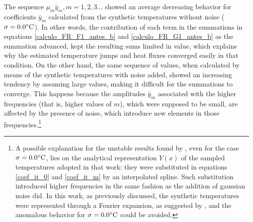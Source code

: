 \documentclass[12pt]{CHT-20}
\begin{document}
The sequence ${\mu_m\bar{y}_m, m = 1, 2, 3 \dots}$ showed an average decreasing behavior for coefficients $\bar{y}_m$ calculated from the synthetic temperatures without noise ($\sigma = 0.0\celsius$). In other words, the contribution of each term in the summations in equations \eqref{calculo_FR_F1_antes_b} and \eqref{calculo_FR_G1_antes_b} as the summation advanced, kept the resulting sums limited in value, which explains why the estimated temperature jumps and heat fluxes converged easily in that condition. On the other hand, the same sequence of values, when calculated by means of the synthetic temperatures with noise added, showed an increasing tendency by assuming large values, making it difficult for the summations to converge. This happens because the amplitudes $\bar{y}_m$ associated with the higher frequencies (that is, higher values of $m$), which were supposed to be small, are affected by the presence of noise, which introduce new elements in those frequencies.\footnote{A possible explanation for the unstable results found by \cite{artigo_padilha_3}, even for the case $\sigma = 0.0\celsius$, lies on the analytical representation $Y(x)$ of the sampled temperatures adopted in that work: they were substituted in equations \eqref{coef_it_0} and \eqref{coef_it_m} by an interpolated spline. Such substitution introduced higher frequencies in the same fashion as the addition of gaussian noise did. In this work, as previously discussed, the synthetic temperatures were represented through a Fourier expansion, as suggested by \cite{artigo_mocerino}, and the anomalous behavior for $\sigma = 0.0\celsius$ could be avoided.}
\end{document}
